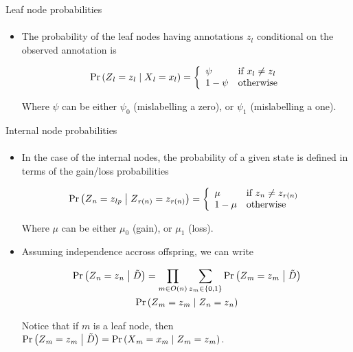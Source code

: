 \documentclass[9pt,ignorenonframetext,]{beamer}
\newcommand{\Prcond}[2]{{\mbox{Pr}\left(#1\vphantom{#2}\;\right|\left.\vphantom{#1}#2\right)}}
\newcommand{\aphylo}{D{}}      %
\newcommand{\aphyloObs}{\tilde \aphylo{}} %
\newcommand{\Ann}{Z{}} %
\newcommand{\ann}{z{}} %
\newcommand{\AnnObs}{X{}}
\newcommand{\annObs}{x{}}
\begin{document}
\begin{frame}[t,label=leafnodesprob]{Leaf node probabilities}

\framesubtitle{\hyperlink{peelingalgorithm<2>}{}}

\begin{itemize}
\item
  The probability of the leaf nodes having annotations \(\ann_l\)
  conditional on the observed annotation is

  \begin{equation}
  \label{eq:leaf1}
  \Prcond{\Ann_{l} = \ann_{l}}{\AnnObs_{l} = \annObs_{l}} = \left\{
  \begin{array}{ll}
  \psi &\mbox{if }\annObs_{l} \neq \ann_{l} \\
  1 - \psi & \mbox{otherwise}
  \end{array}
  \right.
  \end{equation}

  Where \(\psi\) can be either \(\psi_0\) (mislabelling a zero), or
  \(\psi_1\) (mislabelling a one).
\end{itemize}

\end{frame}

\begin{frame}[t,label=internalnodeprob]{Internal node probabilities}

\framesubtitle{\hyperlink{peelingalgorithm<2>}{}}

\begin{itemize}
\item
  In the case of the internal nodes, the probability of a given state is
  defined in terms of the gain/loss probabilities

  \[
  \Prcond{\Ann_{n} = \ann_{lp}}{\Ann_{r(n)} = \ann_{r(n)}} = \left\{
  \begin{array}{ll}
  \mu & \mbox{if }\ann_{n} \neq \ann_{r(n)} \\
  1 - \mu & \mbox{otherwise}
  \end{array}
  \right.
  \]

  Where \(\mu\) can be either \(\mu_0\) (gain), or \(\mu_1\) (loss).
\item
  Assuming independence accross offspring, we can write

  \begin{multline}
  \label{eq:interior1}
  \Prcond{\Ann_n = \ann_n}{\aphyloObs} = %
  \prod_{m \in O(n)} \sum_{\ann_m \in \{0,1\}} \Prcond{\Ann_m = \ann_m}{\aphyloObs} \\
  \Prcond{\Ann_{m} = \ann_{m}}{\Ann_{n} = \ann_{n}}
  \end{multline}

  Notice that if \(m\) is a leaf node, then
  \(\Prcond{\Ann_m = \ann_m}{\aphyloObs} = \Prcond{\AnnObs_m = \annObs_m}{\Ann_m = \ann_m}\).
\end{itemize}

\end{frame}
\end{document}
